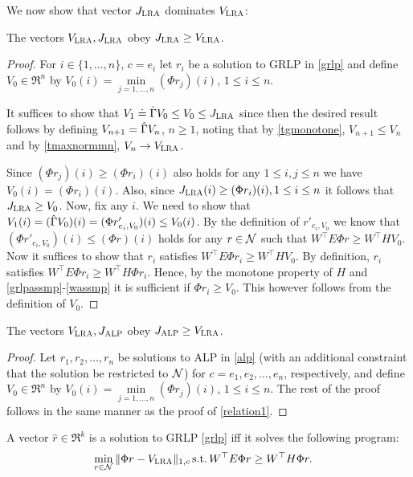 We now show that vector $J_{\text{\sc LRA}}$ dominates $V_{\text{\sc LRA}}$:
\begin{lemma}\label{relation1}
The vectors $V_{\text{\sc LRA}},J_{\text{\sc LRA}}$ obey $J_{\text{\sc LRA}}\geq V_{\text{\sc LRA}}$.
\end{lemma}
\begin{proof}
For $i\in \{1,\dots,n\}$, $c=e_i$ let $r_i$ be a solution to GRLP in \eqref{grlp}
and define $V_0\in \Re^n$ by $V_0(i)=\underset{j=1,\ldots,n}{\min}(\Phi r_j)(i)$, $1\le i \le n$.

It suffices to show that $V_1\doteq \hat{\Gamma} V_0 \le V_0 \le J_{\text{\sc LRA}}$ since then the desired result follows
by defining $V_{n+1} = \hat{\Gamma} V_n$, $n\ge 1$, noting that by \cref{tgmonotone}, $V_{n+1}\le V_{n}$ and by  \cref{tmaxnormmn}, $V_n \to V_{\text{\sc LRA}}$.

Since $(\Phi r_j)(i) \ge (\Phi r_i)(i)$ also holds for any $1\leq i,j\leq n$ we have $V_0(i)  = (\Phi r_i)(i)$. Also, since $J_{\text{\sc LRA}}(i) \ge (\Phi r_i)(i),1\leq i \leq n$ it follows that $J_{\text{\sc LRA}}\geq V_0$. 
Now,  fix any $i$. 
We need to show that $V_1(i)=(\hat{\Gamma} V_0)(i) = (\Phi r'_{e_i,V_0})(i) \leq V_0(i)$. 
By the definition of $r'_{e_i,V_0}$ we know that $(\Phi r'_{e_i,V_0})(i) \le (\Phi r)(i)$
holds for any $r\in \mathcal{N}$ such that $W^\top E \Phi r \ge W^\top H V_0$. 
Now it suffices to show that $r_i$ satisfies $W^\top E \Phi r_i \ge W^\top H V_0$. 
By definition, $r_i$ satisfies $W^\top E \Phi r_i \ge W^\top H \Phi r_i$.
Hence, by the monotone property of $H$ and \cref{grlpassmp}-\eqref{wassmp} it is sufficient if $\Phi r_i \ge V_0$.
This however follows from the definition of $V_0$.
\end{proof}
\begin{lemma}\label{relation2}
The vectors $V_{\text{\sc LRA}},J_{\text{\sc ALP}}$ obey $J_{\text{\sc ALP}}\geq V_{\text{\sc LRA}}$.
\end{lemma}
\begin{proof}
Let $ r_1,  r_2,\ldots, r_n$ be solutions to ALP in \eqref{alp} (with an additional constraint that the solution be restricted to $\mathcal{N}$) for $c=e_1, e_2,\ldots,e_n$, respectively,
and define $V_0\in \Re^n$ by $V_0(i)=\underset{j=1,\ldots,n}{\min}(\Phi r_j)(i)$, $1\le i \le n$. The rest of the proof 
follows in the same manner as the proof of \cref{relation1}.
\end{proof}
\begin{lemma}\label{srw}
A vector
$\hat{r} \in \Re^k$ is a solution to GRLP \eqref{grlp} iff it solves the following program:
\begin{align}\label{grlpeqprog}
\begin{split}
\min_{r\in \N}\, &\norm{\Phi r-\hv}_{1,c}\,\mb
\text{s.t.}\mb \, W^\top E \Phi r\geq W^\top H \Phi r.
\end{split}
\end{align}
\end{lemma}
